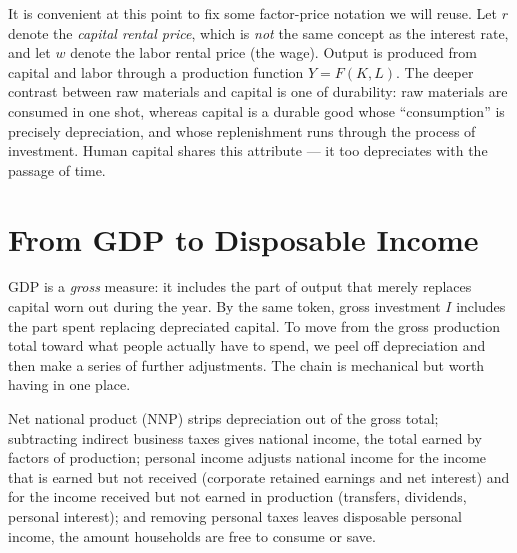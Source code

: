 
It is convenient at this point to fix some factor-price notation we will reuse. Let $r$ denote the \emph{capital rental price}, which is \emph{not} the same concept as the interest rate, and let $w$ denote the labor rental price (the wage). Output is produced from capital and labor through a production function $Y = F(K, L)$. The deeper contrast between raw materials and capital is one of durability: raw materials are consumed in one shot, whereas capital is a durable good whose ``consumption'' is precisely depreciation, and whose replenishment runs through the process of investment. Human capital shares this attribute --- it too depreciates with the passage of time.

\section{From GDP to Disposable Income}

GDP is a \emph{gross} measure: it includes the part of output that merely replaces capital worn out during the year. By the same token, gross investment $I$ includes the part spent replacing depreciated capital. To move from the gross production total toward what people actually have to spend, we peel off depreciation and then make a series of further adjustments. The chain is mechanical but worth having in one place.


Net national product (NNP) strips depreciation out of the gross total; subtracting indirect business taxes gives national income, the total earned by factors of production; personal income adjusts national income for the income that is earned but not received (corporate retained earnings and net interest) and for the income received but not earned in production (transfers, dividends, personal interest); and removing personal taxes leaves disposable personal income, the amount households are free to consume or save.

